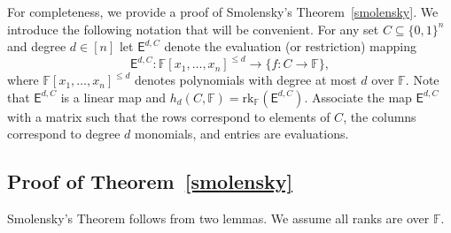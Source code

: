 \documentclass[11pt]{article}
\theoremstyle{definition}
\newcommand{\rk}{\mathrm{rk}}
\newcommand{\1}{\mathbf{1}}
\newcommand{\F}{{\mathbb F}}
\renewcommand{\leq}{\leqslant}
\renewcommand{\geq}{\geqslant}
\newcommand{\edc}{\mathsf{E}^{d,C}}
\newcommand{\bitsz}{\{0,1\}^n}
\begin{document}
\begin{appendix}
%


For completeness, we provide a proof of  Smolensky's Theorem~\ref{smolensky}.       We introduce the following notation that will be convenient.   For any set $C \subseteq \{0, 1\}^n$ and degree $d \in [n]$ let $\edc$ denote the evaluation (or restriction) mapping 
\[\edc : \F[x_1,\ldots,x_n]^{\leq d} \to \{f:C \to \F\},\]
where  $\F[x_1,\ldots,x_n]^{\leq d}$ denotes polynomials with degree at most $d$ over $\F$.  Note that $\edc$ is a linear map and  $h_d(C,\F) = \rk_\F(\edc)$.  Associate the map $\edc$ with a matrix such that the rows correspond to elements of $C$, the columns correspond to degree $d$ monomials, and entries are evaluations. 

\subsection{Proof of Theorem~\ref{smolensky}}
Smolensky's Theorem follows from two lemmas.  We assume all ranks are over $\F$.  %







\end{appendix}
\end{document}
